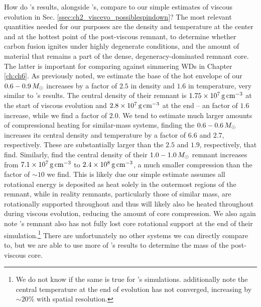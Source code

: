 How do \cite{ji+13}'s results, alongside \cite{schw+12}'s, compare to our simple estimates of viscous evolution in Sec. \ref{ssec:ch2_viscevo_possiblespindown}?  The most relevant quantities needed for our purposes are the density and temperature at the center and at the hottest point of the post-viscous remnant, to determine whether carbon fusion ignites under highly degenerate conditions, and the amount of material that remains a part of the dense, degeneracy-dominated remnant core.  The latter is important for comparing against simmering WDs in Chapter \ref{ch:ch6}.  As previously noted, we estimate the base of the hot envelope of our $0.6-0.9\,\Msun$ increases by a factor of $2.5$ in density and $1.6$ in temperature, very similar to \cite{schw+12}'s results.  The central density of their remnant is $1.75\times10^7\,\gcc$ at the start of viscous evolution \citep{dan+11} and $2.8\times10^7\,\gcc$ at the end -- an factor of $1.6$ increase, while we find a factor of $2.0$.  We tend to estimate much larger amounts of compressional heating for similar-mass systems, finding the $0.6 - 0.6\,\Msun$ increases its central density and temperature by a factor of $6.6$ and $2.7$, respectively.  These are substantially larger than the $2.5$ and $1.9$, respectively, that \cite{ji+13} find.  Similarly, \cite{rask+14} find the central density of their $1.0-1.0\,\Msun$ remnant increases from $7.1\times10^7\,\gcc$ to $2.4\times10^8\,\gcc$, a much smaller compression than the factor of $\sim10$ we find.  This is likely due our simple estimate assumes all rotational energy is deposited as heat solely in the outermost regions of the remnant, while in reality remnants, particularly those of similar mass, are rotationally supported throughout and thus will likely also be heated throughout during viscous evolution, reducing the amount of core compression.  We also again note \cite{ji+13}'s remnant also has not fully lost core rotational support at the end of their simulation.\footnote{We do not know if the same is true for \cite{rask+14}'s simulations.  \cite{ji+13} additionally note the central temperature at the end of evolution has not converged, increasing by $\sim20$\% with spatial resolution.}  There are unfortunately no other systems we can directly compare to, but we are able to use more of \cite{schw+12}'s results to determine the mass of the post-viscous core. 


